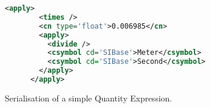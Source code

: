 \begin{figure}[h]
  \begin{center}
    \lstset{
      basicstyle=\footnotesize,
      xleftmargin=.2\textwidth, xrightmargin=.2\textwidth
    }

    \begin{lstlisting}[language=XML]
      <apply>
        <times />
        <cn type='float'>0.006985</cn>
        <apply>
          <divide />
          <csymbol cd='SIBase'>Meter</csymbol>
          <csymbol cd='SIBase'>Second</csymbol>
        </apply>
      </apply>
    \end{lstlisting}
  \end{center}
  \caption{Serialisation of a simple Quantity Expression. }
  \label{fig:ser1}
\end{figure}
